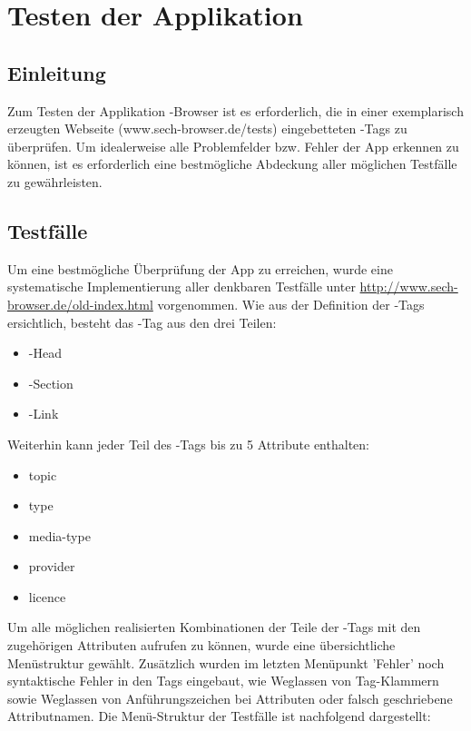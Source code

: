 \chapter{Testen der Applikation}

\section{Einleitung}

Zum Testen der Applikation \SECH-Browser ist es erforderlich, die in einer exemplarisch erzeugten Webseite (www.sech-browser.de/tests) eingebetteten \SEARCH-Tags zu überprüfen. Um idealerweise alle Problemfelder bzw. Fehler der App erkennen zu können, ist es erforderlich eine bestmögliche Abdeckung aller möglichen Testfälle zu gewährleisten.  

\section{Testfälle} 

Um eine bestmögliche Überprüfung der App zu erreichen, wurde eine systematische Implementierung aller denkbaren Testfälle unter \url{http://www.sech-browser.de/old-index.html} vorgenommen. Wie aus der Definition der \SEARCH-Tags ersichtlich, besteht das \SEARCH-Tag aus den drei Teilen:

\begin {itemize} 
   \item \SEARCH-Head
   \item \SEARCH-Section
   \item \SEARCH-Link
\end {itemize}

Weiterhin kann jeder Teil des \SEARCH-Tags bis zu 5 Attribute enthalten:

\begin {itemize}
   \item topic
   \item type
   \item media-type
   \item provider
   \item licence
\end {itemize}

Um alle möglichen realisierten Kombinationen der Teile der \SEARCH-Tags mit den zugehörigen Attributen aufrufen zu können, wurde eine übersichtliche Menüstruktur gewählt. Zusätzlich wurden im letzten Menüpunkt 'Fehler' noch syntaktische Fehler in den Tags eingebaut, wie Weglassen von Tag-Klammern sowie Weglassen von Anführungszeichen bei Attributen oder falsch geschriebene Attributnamen.   
Die Menü-Struktur der Testfälle ist nachfolgend dargestellt:

